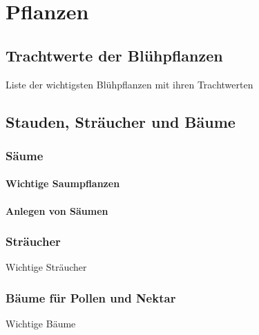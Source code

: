 \documentclass[
]{book}
\begin{document}
\hypertarget{pflanzen}{%
\chapter{Pflanzen}\label{pflanzen}}

\hypertarget{trachtwerte-der-bluxfchpflanzen}{%
\section{Trachtwerte der Blühpflanzen}\label{trachtwerte-der-bluxfchpflanzen}}

Liste der wichtigsten Blühpflanzen mit ihren Trachtwerten

\hypertarget{stauden-struxe4ucher-und-buxe4ume}{%
\section{Stauden, Sträucher und Bäume}\label{stauden-struxe4ucher-und-buxe4ume}}

\hypertarget{suxe4ume-2}{%
\subsection{Säume}\label{suxe4ume-2}}

\hypertarget{wichtige-saumpflanzen}{%
\subsubsection{Wichtige Saumpflanzen}\label{wichtige-saumpflanzen}}

\hypertarget{anlegen-von-suxe4umen}{%
\subsubsection{Anlegen von Säumen}\label{anlegen-von-suxe4umen}}

\hypertarget{struxe4ucher-1}{%
\subsection{Sträucher}\label{struxe4ucher-1}}

Wichtige Sträucher

\hypertarget{buxe4ume-fuxfcr-pollen-und-nektar}{%
\subsection{Bäume für Pollen und Nektar}\label{buxe4ume-fuxfcr-pollen-und-nektar}}

Wichtige Bäume
\end{document}
